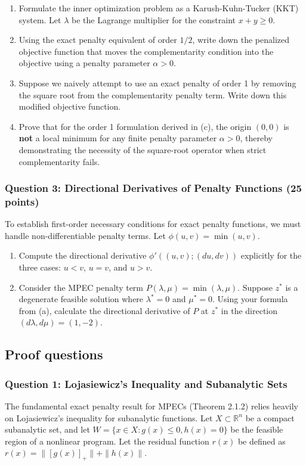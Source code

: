 \documentclass[pdflatex,sn-mathphys-num]{sn-jnl}%
\theoremstyle{definition}
\begin{document}
\begin{enumerate}
    \item[(a)] Formulate the inner optimization problem as a Karush-Kuhn-Tucker (KKT) system. Let $\lambda$ be the Lagrange multiplier for the constraint $x + y \ge 0$.
    \item[(b)] Using the exact penalty equivalent of order $1/2$, write down the penalized objective function that moves the complementarity condition into the objective using a penalty parameter $\alpha > 0$.
    \item[(c)] Suppose we naively attempt to use an exact penalty of order 1 by removing the square root from the complementarity penalty term. Write down this modified objective function.
    \item[(d)] Prove that for the order 1 formulation derived in (c), the origin $(0,0)$ is \textbf{not} a local minimum for any finite penalty parameter $\alpha > 0$, thereby demonstrating the necessity of the square-root operator when strict complementarity fails.
\end{enumerate}

\subsubsection*{Question 3: Directional Derivatives of Penalty Functions (25 points)}
To establish first-order necessary conditions for exact penalty functions, we must handle non-differentiable penalty terms. Let $\phi(u,v) = \min(u,v)$.

\begin{enumerate}[label=(\roman*)]
    \item Compute the directional derivative $\phi'((u,v); (du, dv))$ explicitly for the three cases: $u < v$, $u = v$, and $u > v$.
    \item Consider the MPEC penalty term $P(\lambda, \mu) = \min(\lambda, \mu)$. Suppose $z^*$ is a degenerate feasible solution where $\lambda^* = 0$ and $\mu^* = 0$. Using your formula from (a), calculate the directional derivative of $P$ at $z^*$ in the direction $(d\lambda, d\mu) = (1, -2)$. 
\end{enumerate}

\subsection{Proof questions}
\subsubsection*{Question 1: Lojasiewicz's Inequality and Subanalytic Sets}
The fundamental exact penalty result for MPECs (Theorem 2.1.2) relies heavily on Lojasiewicz's inequality for subanalytic functions. Let $X \subset \mathbb{R}^n$ be a compact subanalytic set, and let $W = \{x \in X : g(x) \le 0, h(x) = 0\}$ be the feasible region of a nonlinear program. Let the residual function $r(x)$ be defined as $r(x) = \| [g(x)]_+ \| + \|h(x)\|$.
\end{document}
